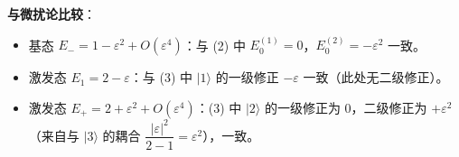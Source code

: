 \begin{enumerate}
{\begin{enumerate}
		\textbf{与微扰论比较}：
		\begin{itemize}
			\item 基态 $E_-=1-\varepsilon^2+O(\varepsilon^4)$：与 (2) 中 $E_0^{(1)}=0$，$E_0^{(2)}=-\varepsilon^2$ 一致。
			\item 激发态 $E_1=2-\varepsilon$：与 (3) 中 $|1\rangle$ 的一级修正 $-\varepsilon$ 一致（此处无二级修正）。
			\item 激发态 $E_+=2+\varepsilon^2+O(\varepsilon^4)$：(3) 中 $|2\rangle$ 的一级修正为 0，二级修正为 $+\varepsilon^2$（来自与 $|3\rangle$ 的耦合 $\dfrac{|\varepsilon|^2}{2-1}=\varepsilon^2$），一致。
		\end{itemize}
	\end{enumerate}
	}

\end{enumerate}
